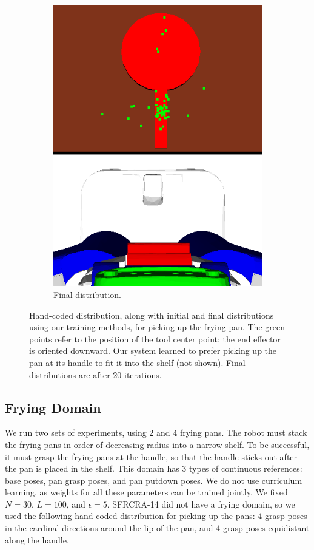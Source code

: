 \begin{figure}[t]
\begin{subfigure}[b]{0.25\linewidth}
    \includegraphics[width=\textwidth]{images/frying_final.png}
    \caption{Final distribution.}
  \end{subfigure}
  \caption{\small{Hand-coded distribution, along with initial and final distributions using our training methods,
for picking up the frying pan. The green points refer to the position of the tool center point; the end
effector is oriented downward. Our system learned to prefer picking up the pan at its handle to fit it into the shelf (not shown). Final distributions are after 20 iterations.}}
  \label{fig:frying}
\end{figure}

\subsection{Frying Domain}
We run two sets of experiments, using 2 and 4 frying pans. The robot must stack the frying pans in order of decreasing
radius into a narrow shelf. To be successful, it must grasp the frying pans at the handle, so that the handle sticks out
after the pan is placed in the shelf. This domain has 3 types of continuous references: base poses, pan grasp poses, and
pan putdown poses. We do not use curriculum learning, as weights for all these parameters can be trained jointly.
We fixed $N = 30$, $L = 100$, and $\epsilon = 5$. SFRCRA-14 did not have a frying domain, so we used the following
hand-coded distribution for picking up the pans: 4 grasp poses in the cardinal directions around the lip of the pan,
and 4 grasp poses equidistant along the handle.

